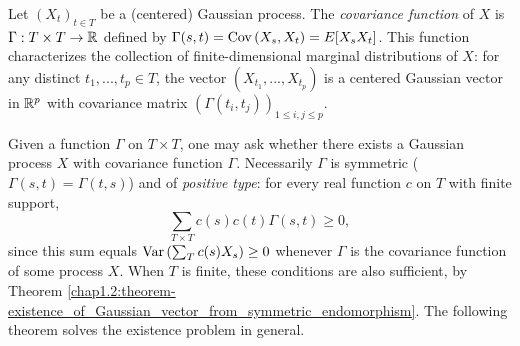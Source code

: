 Let $(X_t)_{t \in T}$ be a (centered) Gaussian process. The \textit{covariance function} of $X$ is $\Gamma: T \times T \to \mathbb{R}$ defined by $\Gamma(s,t)=\operatorname{Cov}\left(X_s, X_t\right)=E[X_sX_t]$. This function characterizes the collection of finite-dimensional marginal distributions of $X$: for any distinct $t_1,...,t_p \in T$, the vector $(X_{t_1},...,X_{t_p})$ is a centered Gaussian vector in $\mathbb{R}^p$ with covariance matrix $(\Gamma(t_i,t_j))_{1\leq i,j \leq p}$.

Given a function $\Gamma$ on $T \times T$, one may ask whether there exists a Gaussian process $X$ with covariance function $\Gamma$. Necessarily $\Gamma$ is symmetric ($\Gamma(s,t)=\Gamma(t,s)$) and of \textit{positive type}: for every real function $c$ on $T$ with finite support,
$$\sum_{T \times T}c(s)c(t)\Gamma(s,t)\geq0,$$
since this sum equals $\operatorname{Var}\left(\sum_Tc(s)X_s\right)\geq0$ whenever $\Gamma$ is the covariance function of some process $X$. When $T$ is finite, these conditions are also sufficient, by Theorem \ref{chap1.2:theorem-existence_of_Gaussian_vector_from_symmetric_endomorphism}. The following theorem solves the existence problem in general.

